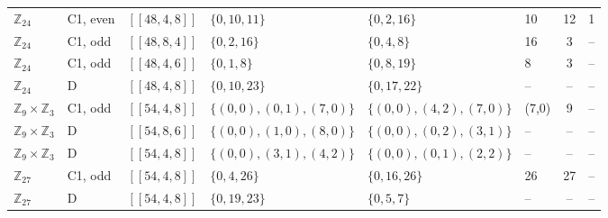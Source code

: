 \documentclass[reprint,twocolumn,superscriptaddress,nofootinbib]{revtex4-2}
\theoremstyle{plain}
\begin{document}
\begin{table}[!t]
\begin{ruledtabular}
\begin{tabular}{llllllcc}
$\mathbb{Z}_{24}$ & C1, even & $[[48,4,8]]$ & $\{0,10,11\}$ & $\{0,2,16\}$ & 10 & 12 & 1 \\
$\mathbb{Z}_{24}$ & C1, odd & $[[48,8,4]]$ & $\{0,2,16\}$ & $\{0,4,8\}$ & 16 & 3 & -- \\
$\mathbb{Z}_{24}$ & C1, odd & $[[48,4,6]]$ & $\{0,1,8\}$ & $\{0,8,19\}$ & 8 & 3 & -- \\
$\mathbb{Z}_{24}$ & D & $[[48,4,8]]$ & $\{0,10,23\}$ & $\{0,17,22\}$ & -- & -- & -- \\
$\mathbb{Z}_{9}\times\mathbb{Z}_{3}$ & C1, odd & $[[54,4,8]]$ & $\{(0,0),(0,1),(7,0)\}$ & $\{(0,0),(4,2),(7,0)\}$ & (7,0) & 9 & -- \\
$\mathbb{Z}_{9}\times\mathbb{Z}_{3}$ & D & $[[54,8,6]]$ & $\{(0,0),(1,0),(8,0)\}$ & $\{(0,0),(0,2),(3,1)\}$ & -- & -- & -- \\
$\mathbb{Z}_{9}\times\mathbb{Z}_{3}$ & D & $[[54,4,8]]$ & $\{(0,0),(3,1),(4,2)\}$ & $\{(0,0),(0,1),(2,2)\}$ & -- & -- & -- \\
$\mathbb{Z}_{27}$ & C1, odd & $[[54,4,8]]$ & $\{0,4,26\}$ & $\{0,16,26\}$ & 26 & 27 & -- \\
$\mathbb{Z}_{27}$ & D & $[[54,4,8]]$ & $\{0,19,23\}$ & $\{0,5,7\}$ & -- & -- & -- \\
\end{tabular}
\end{ruledtabular}
\end{table}
\end{document}
